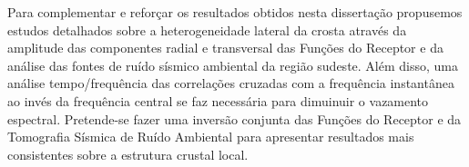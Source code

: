 Para complementar e reforçar os resultados obtidos nesta dissertação propusemos estudos detalhados sobre a heterogeneidade lateral da crosta através da amplitude das componentes radial e transversal das Funções do Receptor e da análise das fontes de ruído sísmico ambiental da região sudeste. Além disso, uma análise tempo/frequência das correlações cruzadas com a frequência instantânea ao invés da frequência central se faz necessária para dimuinuir o vazamento espectral. Pretende-se fazer uma inversão conjunta das Funções do Receptor e da Tomografia Sísmica de Ruído Ambiental para apresentar resultados mais consistentes sobre a estrutura crustal local.